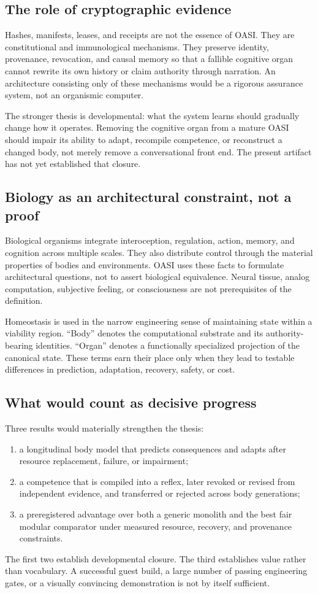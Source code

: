 \documentclass[journal,10pt]{IEEEtran}
\newcommand{\OASI}{\textsc{OASI}}
\begin{document}
\subsection{The role of cryptographic evidence}
Hashes, manifests, leases, and receipts are not the essence of \OASI{}. They are constitutional and immunological mechanisms. They preserve identity, provenance, revocation, and causal memory so that a fallible cognitive organ cannot rewrite its own history or claim authority through narration. An architecture consisting only of these mechanisms would be a rigorous assurance system, not an organismic computer.

The stronger thesis is developmental: what the system learns should gradually change how it operates. Removing the cognitive organ from a mature \OASI{} should impair its ability to adapt, recompile competence, or reconstruct a changed body, not merely remove a conversational front end. The present artifact has not yet established that closure.

\subsection{Biology as an architectural constraint, not a proof}
Biological organisms integrate interoception, regulation, action, memory, and cognition across multiple scales. They also distribute control through the material properties of bodies and environments. \OASI{} uses these facts to formulate architectural questions, not to assert biological equivalence. Neural tissue, analog computation, subjective feeling, or consciousness are not prerequisites of the definition.

Homeostasis is used in the narrow engineering sense of maintaining state within a viability region. ``Body'' denotes the computational substrate and its authority-bearing identities. ``Organ'' denotes a functionally specialized projection of the canonical state. These terms earn their place only when they lead to testable differences in prediction, adaptation, recovery, safety, or cost.

\subsection{What would count as decisive progress}
Three results would materially strengthen the thesis:
\begin{enumerate}
  \item a longitudinal body model that predicts consequences and adapts after resource replacement, failure, or impairment;
  \item a competence that is compiled into a reflex, later revoked or revised from independent evidence, and transferred or rejected across body generations;
  \item a preregistered advantage over both a generic monolith and the best fair modular comparator under measured resource, recovery, and provenance constraints.
\end{enumerate}
The first two establish developmental closure. The third establishes value rather than vocabulary. A successful guest build, a large number of passing engineering gates, or a visually convincing demonstration is not by itself sufficient.
\end{document}
